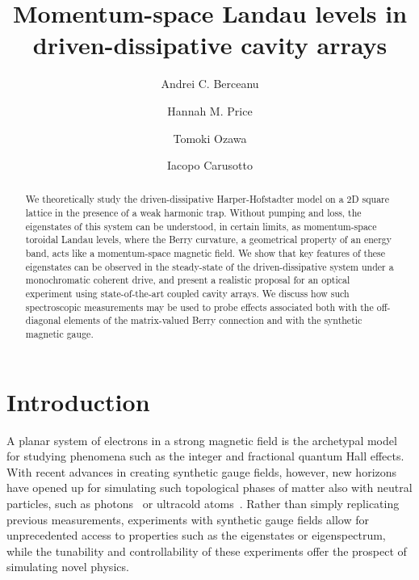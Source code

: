 \documentclass[twocolumn, 10pt, aps, superscriptaddress, floatfix, showpacs, pra, citeautoscript]{revtex4-1}
\begin{document}
\title{Momentum-space Landau levels in driven-dissipative cavity arrays}


\author{Andrei C. Berceanu}
\author{Hannah M. Price}
\author{Tomoki Ozawa}
\author{Iacopo Carusotto}

\begin{abstract}
  We theoretically study the driven-dissipative Harper-Hofstadter model on a
  2D square lattice in the presence of a weak harmonic trap. Without pumping and loss, the eigenstates of this system can be understood, in certain limits, as momentum-space toroidal Landau levels, where the Berry curvature, a geometrical property of an energy band, acts like a momentum-space magnetic field. We show that key features of these eigenstates can be observed in the  steady-state of the driven-dissipative system under a monochromatic coherent drive, and present a realistic proposal for an optical experiment using state-of-the-art coupled cavity arrays. We discuss how such spectroscopic measurements may be used to probe effects associated both with the off-diagonal elements of the matrix-valued Berry connection and with the synthetic magnetic gauge.
\end{abstract}

\maketitle


\section{Introduction}

A planar system of electrons in a
strong magnetic field is the archetypal model for studying phenomena such as the
integer and fractional quantum Hall effects. With recent advances in creating
synthetic gauge fields, however, new horizons have opened up for simulating such topological phases of matter also with neutral particles, such as photons~\cite{hafezi2014synthetic} or ultracold atoms~\cite{dalibardrmp2011, goldman_repprog_2014, Goldman_arxiv_2015}. 
Rather than simply replicating previous measurements, experiments with synthetic gauge fields allow for unprecedented access to properties such as the eigenstates or eigenspectrum, while the tunability and controllability of these experiments offer the prospect of simulating novel physics. 
\end{document}
